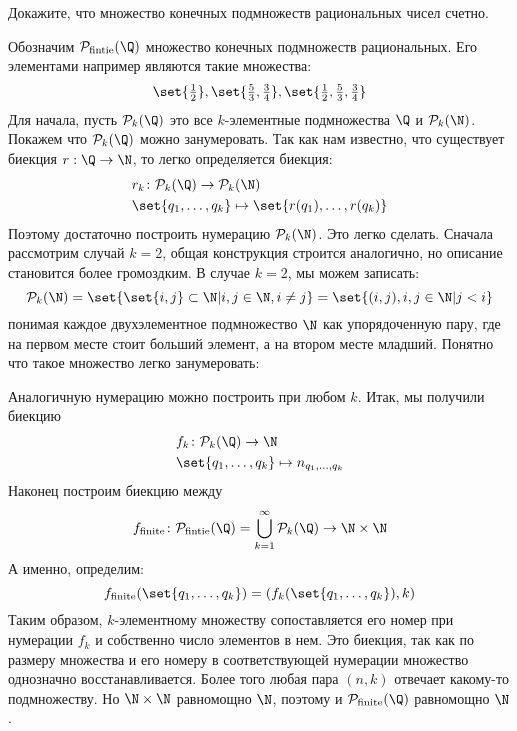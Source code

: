 \documentclass[a4paper,12pt,twoside]{article}
\begin{document}
\begin{?}
    Докажите, что множество конечных подмножеств рациональных чисел счетно.
\end{?}
\begin{solution}{}
    Обозначим $\mathcal{P}_{\mathrm{fintie}}(\Q)$ множество конечных подмножеств рациональных. Его элементами например являются такие множества:
    $$
        \set{\tfrac{1}{2}}, \set{\tfrac{5}{3}, \tfrac{3}{4}},  \set{\tfrac{1}{2}, \tfrac{5}{3}, \tfrac{3}{4}}  
    $$
    Для начала, пусть $\mathcal{P}_k(\Q)$ это все $k$-элементные подмножества $\Q$ и $\mathcal{P}_k(\N)$. Покажем что $\mathcal{P}_k(\Q)$ можно занумеровать. Так как нам известно, что существует биекция $r : \Q \to \N$, то легко определяется биекция:
    \begin{align*}
        & r_k \colon \mathcal{P}_k(\Q) \to \mathcal{P}_k(\N) \\
        & \set{q_1, \ldots, q_k} \mapsto \set{r(q_1), \ldots, r(q_k)}
    \end{align*}
    Поэтому достаточно построить нумерацию $\mathcal{P}_k(\N)$. Это легко сделать. Сначала рассмотрим случай $k = 2$, общая конструкция строится аналогично, но описание становится более громоздким. В случае $k = 2$, мы можем записать:
    $$
        \mathcal{P}_k(\N) = \set{\set{i, j} \subset \N | i, j \in \N, i \neq j} = \set{(i, j), i, j \in \N | j < i}
    $$
    понимая каждое двухэлементное подмножество $\N$ как упорядоченную пару, где на первом месте стоит больший элемент, а на втором месте младший. Понятно что такое  множество легко занумеровать:
    \begin{figure}[h!]
        \centering
    \end{figure}
    
    \noindent Аналогичную нумерацию можно построить при любом $k$. Итак, мы получили биекцию
    \begin{align*}
        & f_k \colon \mathcal{P}_k(\Q) \to \N \\
        & \set{q_1, \ldots, q_k} \mapsto n_{q_1, \ldots, q_k}
    \end{align*}
    Наконец построим биекцию между 
    $$
        f_{\mathrm{finite}} \colon \mathcal{P}_{\mathrm{fintie}}(\Q) = \bigcup_{k = 1}^{\infty}\mathcal{P}_k(\Q) \to \N \times \N
    $$
    А именно, определим:
    $$
        f_{\mathrm{finite}}(\set{q_1, \ldots, q_k}) = (f_k(\set{q_1, \ldots, q_k}), k)
    $$
    Таким образом, $k$-элементному множеству сопоставляется его номер при нумерации $f_k$ и собственно число элементов в нем. Это биекция, так как по размеру множества и его номеру в соответствующей нумерации множество однозначно восстанавливается. Более того любая пара $(n, k)$ отвечает какому-то подмножеству. Но $\N \times \N$ равномощно $\N$, поэтому и $\mathcal{P}_{\mathrm{finite}}(\Q)$ равномощно $\N$.
\end{solution}
\end{document}
